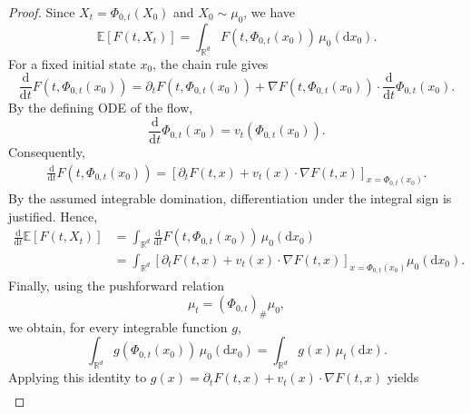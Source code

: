 \documentclass[12pt,a4paper,oneside]{book}
\begin{document}
\begin{proof}
Since $X_t=\Phi_{0,t}(X_0)$ and $X_0\sim\mu_0$, we have
\begin{equation*}
    \mathbb E[F(t,X_t)] = \int_{\mathbb R^d} F(t,\Phi_{0,t}(x_0))\,\mu_0(\mathrm dx_0).
\end{equation*}
For a fixed initial state $x_0$, the chain rule gives
\begin{equation*}
    \frac{\mathrm d}{\mathrm dt} F(t,\Phi_{0,t}(x_0))
    = \partial_t F(t,\Phi_{0,t}(x_0)) + \nabla F(t,\Phi_{0,t}(x_0)) \cdot\frac{\mathrm d}{\mathrm dt}\Phi_{0,t}(x_0).
\end{equation*}
By the defining ODE of the flow,
\begin{equation*}
    \frac{\mathrm d}{\mathrm dt}\Phi_{0,t}(x_0) = v_t(\Phi_{0,t}(x_0)).
\end{equation*}
Consequently,
\begin{equation*}
\begin{aligned}
    \frac{\mathrm d}{\mathrm dt}
    F(t,\Phi_{0,t}(x_0))
    =
    \left[
        \partial_t F(t,x)
        +v_t(x)\cdot\nabla F(t,x)
    \right]_{x=\Phi_{0,t}(x_0)}.
\end{aligned}
\end{equation*}
By the assumed integrable domination, differentiation under the integral sign is justified. Hence,
\begin{equation*}
\begin{aligned}
    \frac{\mathrm d}{\mathrm dt}\mathbb E[F(t,X_t)]
    &=
    \int_{\mathbb R^d}
    \frac{\mathrm d}{\mathrm dt}
    F(t,\Phi_{0,t}(x_0))\,\mu_0(\mathrm dx_0)\\
    &=
    \int_{\mathbb R^d}
    \left[
        \partial_t F(t,x)
        +v_t(x)\cdot\nabla F(t,x)
    \right]_{x=\Phi_{0,t}(x_0)}
    \mu_0(\mathrm dx_0).
\end{aligned}
\end{equation*}
Finally, using the pushforward relation
\begin{equation*}
    \mu_t=(\Phi_{0,t})_\#\mu_0,
\end{equation*}
we obtain, for every integrable function $g$,
\begin{equation*}
    \int_{\mathbb R^d}
    g(\Phi_{0,t}(x_0))\,\mu_0(\mathrm dx_0)
    =
    \int_{\mathbb R^d}g(x)\,\mu_t(\mathrm dx).
\end{equation*}
Applying this identity to
$g(x)=\partial_t F(t,x)+v_t(x)\cdot\nabla F(t,x)$ yields
\begin{equation*}
\begin{aligned}

\end{aligned}
\end{equation*}
\end{proof}
\end{document}
